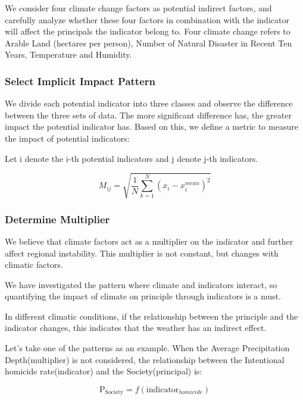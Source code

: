\documentclass{mcmthesis}
\begin{document}
			We consider four climate change factors as potential indirect factors, and carefully analyze whether these four factors in combination with the indicator will affect the principals the indicator belong to. Four climate change refers to Arable Land (hectares per person), Number of Natural Disaster in Recent Ten Years, Temperature and Humidity.
			
			\subsubsection{Select Implicit Impact Pattern}
			
				We divide each potential indicator into three classes and observe the difference between the three sets of data. The more significant difference has, the greater impact the potential indicator has. Based on this, we define a metric to measure the impact of potential indicators:
				
				Let i denote the i-th potential indicators and j denote j-th indicators.
				
				\begin{equation}
				M_{ij} = \sqrt{\frac{1}{N}\sum_{k=1}^N (x_i - x_i^{mean})^2}
				\end{equation}
				
			\subsubsection{Determine Multiplier}
			
				We believe that climate factors act as a multiplier on the indicator and further affect regional instability. This multiplier is not constant, but changes with climatic factors.
			
				We have investigated the pattern where climate and indicators interact, so quantifying the impact of climate on principle through indicators is a must.
				
				In different climatic conditions, if the relationship between the principle and the indicator changes, this indicates that the weather has an indirect effect.
				
				Let's take one of the patterns as an example. When the Average Precipitation Depth(multiplier) is not considered, the relationship between the Intentional homicide rate(indicator) and the Society(principal) is:
				
				\begin{equation}
				\mathrm { P_{Society} } = f \left( \text {indicator} _ { homicide } \right)
				\end{equation}
				
\end{document}

